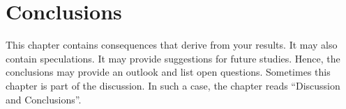 \chapter{Conclusions}\label{concl}
\thispagestyle{plain}

This chapter contains consequences that derive from your results. It may also
contain speculations. It may provide suggestions for future studies. Hence, the
conclusions may provide an outlook and list open questions. Sometimes
this chapter is part of the discussion. In such a case, the chapter reads
``Discussion and Conclusions''.
